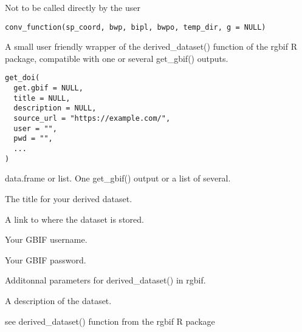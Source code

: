\documentclass[a4paper]{book}
\begin{document}
%
\begin{Description}\relax
Not to be called directly by the user
\end{Description}
%
\begin{Usage}
\begin{verbatim}
conv_function(sp_coord, bwp, bipl, bwpo, temp_dir, g = NULL)
\end{verbatim}
\end{Usage}
%
\begin{Description}\relax
A small user friendly wrapper of the derived\_dataset() function of the
rgbif R package, compatible with one or several get\_gbif() outputs.
\end{Description}
%
\begin{Usage}
\begin{verbatim}
get_doi(
  get.gbif = NULL,
  title = NULL,
  description = NULL,
  source_url = "https://example.com/",
  user = "",
  pwd = "",
  ...
)
\end{verbatim}
\end{Usage}
%
\begin{Arguments}
\begin{ldescription}
\item[\code{get.gbif}] data.frame or list. One get\_gbif() output or a list of several.

\item[\code{title}] The title for your derived dataset.

\item[\code{source\_url}] A link to where the dataset is stored.

\item[\code{user}] Your GBIF username.

\item[\code{pwd}] Your GBIF password.

\item[\code{...}] Additonnal parameters for derived\_dataset() in rgbif.

\item[\code{descritpion}] A description of the dataset.
\end{ldescription}
\end{Arguments}
%
\begin{Details}\relax
see derived\_dataset() function from the rgbif R package
\end{Details}
\end{document}
